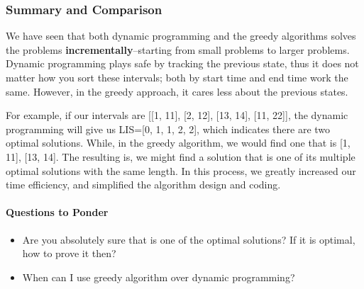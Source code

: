 \documentclass[../main.tex]{subfiles}
\begin{document}
\subsubsection{Summary and Comparison}
We have seen that both dynamic programming and the greedy algorithms solves the problems \textbf{incrementally}--starting from small problems to larger problems. Dynamic programming plays safe by tracking the previous state, thus it does not matter how you sort these intervals; both by start time and end time work the same. However, in the greedy approach, it cares less about the previous states. 


For example, if our intervals are [[1, 11], [2, 12], [13, 14], [11, 22]], the dynamic programming will give us LIS=[0, 1, 1, 2, 2], which indicates there are two optimal solutions. While, in the greedy algorithm, we would find one that is [1, 11], [13, 14]. 
The resulting is, we might find a solution that is one of its multiple optimal solutions with the same length. In this process, we greatly increased our time efficiency, and simplified the algorithm design and coding. 

\paragraph{Questions to Ponder} 
\begin{itemize}
    \item Are you absolutely sure that is one of the optimal solutions? If it is optimal, how to prove it then?
    \item When can I use greedy algorithm over dynamic programming? 
\end{itemize}

\end{document}
